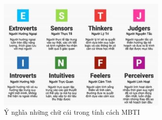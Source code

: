 \begin{figure}[H]
    \centering
    \includegraphics[width=0.75\textwidth]{images/chap2/MBTIper.png}
    \vspace{0.5cm}
    \caption{Ý nghĩa những chữ cái trong tính cách MBTI}
\end{figure}

